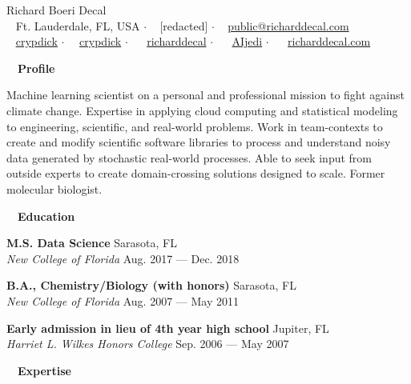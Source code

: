 \documentclass[a4paper,12pt]{article}
\newcommand{\resheading}[1]{{\hspace{-9pt} \colorbox{mygrey}{\begin{minipage}{\textwidth}{\textmd{~~\large \textbf{#1} \vphantom{p\^{E}}}}\end{minipage}}\vspace{6pt}} }
\newcommand{\ressubheading}[4]{{\begin{minipage}{\textwidth}
                                    \textbf{#1} \hfill #2 \\
                                    \textit{#3} \hfill #4 \\
\end{minipage}}}
\begin{document}
    \begin{center}
    {\Huge Richard Boeri Decal}
        \\
        {\small \faMapMarker~ Ft. Lauderdale, FL, USA $\cdot$ \faPhone~ [redacted] $\cdot$ \faEnvelope~ \href{mailto:public@richarddecal.com}{public@richarddecal.com}  \\ \faGithubAlt~ \href{https://github.com/crypdick}{crypdick} $\cdot$~\faStackOverflow~  \href{https://stackoverflow.com/users/4212158/crypdick}{crypdick} $\cdot$ ~\faLinkedin~ \href{https://www.linkedin.com/in/richarddecal/}{richarddecal}  $\cdot$ ~\faTwitter~ \href{https://twitter.com/AIjedi}{AIjedi}  $\cdot$ ~\faHome~  \href{https://www.richarddecal.com}{richarddecal.com}}
    \end{center}

    \resheading{Profile}

    Machine learning scientist on a personal and professional mission to fight against climate change.
    Expertise in applying cloud computing and statistical modeling to engineering, scientific, and real-world problems.
    Work in team-contexts to create and modify scientific software libraries to process and understand noisy data generated by stochastic real-world processes.
    Able to seek input from outside experts to create domain-crossing solutions designed to scale.
    Former molecular biologist.\\

    \resheading{Education}

    \ressubheading{M.S. Data Science}{Sarasota, FL}{New College of Florida}{Aug. 2017 --- Dec. 2018}



    \ressubheading{B.A., Chemistry/Biology (with honors)}{Sarasota, FL}{New College of Florida}{Aug. 2007 --- May 2011}

    \ressubheading{Early admission in lieu of 4th year high school}{Jupiter, FL}{Harriet L. Wilkes Honors College}{Sep. 2006 --- May 2007}


    \resheading{Expertise}
\end{document}
